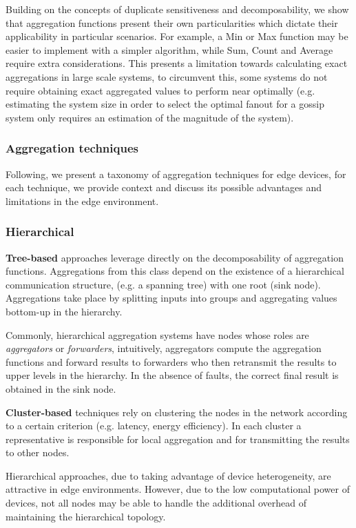 Building on the concepts of duplicate sensitiveness and decomposability, we show that aggregation functions present their own particularities which dictate their applicability in particular scenarios. For example, a Min or Max function may be easier to implement with a simpler algorithm, while Sum, Count and Average require extra considerations. This presents a limitation towards calculating exact aggregations in large scale systems, to circumvent this, some systems do not require obtaining exact aggregated values to perform near optimally  (e.g. estimating the system size in order to select the optimal fanout for a gossip system only requires an estimation of the magnitude of the system). 

\subsubsection{Aggregation techniques}

Following, we present a taxonomy of aggregation techniques for edge devices, for each technique, we provide context and discuss its possible advantages and limitations in the edge environment.

\subsubsection{Hierarchical}

\textbf{Tree-based} approaches leverage directly on the decomposability of aggregation functions. Aggregations from this class depend on the existence of a hierarchical communication structure, (e.g. a spanning tree) with one root (sink node). Aggregations take place by splitting inputs into groups and aggregating values bottom-up in the hierarchy. 

Commonly, hierarchical aggregation systems have nodes whose roles are \textit{aggregators} or \textit{forwarders}, intuitively, aggregators compute the aggregation functions and forward results to forwarders who then retransmit the results to upper levels in the hierarchy. In the absence of faults, the correct final result is obtained in the sink node.

\textbf{Cluster-based} techniques rely on clustering the nodes in the network according to a certain criterion (e.g. latency, energy efficiency). In each cluster a representative is responsible for local aggregation and for transmitting the results to other nodes. 

Hierarchical approaches, due to taking advantage of device heterogeneity, are attractive in edge environments. However, due to the low computational power of devices, not all nodes may be able to handle the additional overhead of maintaining the hierarchical topology.


